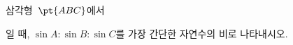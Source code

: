 삼각형~$\pt{ABC}$에서\par\smallskip{}\par\smallskip\noindent 일 때, $\sin A:\sin B:\sin C$를 가장 간단한 자연수의 비로 나타내시오.
